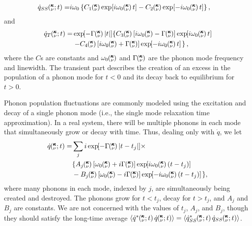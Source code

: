 \begin{equation}\label{A:E:qdot_A_SS}
\begin{split}
\dot{q}_{SS}\kvt=& i\omega_0\left\{C_1\kv\exp[i\omega_0\kv t]-C_2\kv
\exp[-i\omega_0\kv t]\right\} ,
\end{split}
\end{equation}
and
\begin{equation}\label{E:qdot_A_T}
\begin{split}
\dot{q}_{T}\kvt=& \EXP{-\Gamma\kv |t|}\left\{C_3\kv
\left[i\omega_0\kv-\Gamma\kv\right]\EXP{i\omega_0\kv t}\right. \\
& \left.-C_4\kv\left[i\omega_0\kv+\Gamma\kv\right]\EXP{-i\omega_0\kv t}\;
\right\},
\end{split}
\end{equation}
where the $C$s are constants and $\omega_0\mspace{-4.0mu}\left(\mspace{-8.0mu} \begin{smallmatrix}&\pmb{\kappa} \\&\nu\end{smallmatrix} \mspace{-3.0mu}\right)$ and $\Gamma\mspace{-4.0mu}\left(\mspace{-8.0mu} \begin{smallmatrix}&\pmb{\kappa} \\&\nu\end{smallmatrix} \mspace{-3.0mu}\right)$ are the 
phonon
mode frequency and linewidth.  The transient part
describes the creation of an excess in the population of a phonon mode 
for
$t<0$ and its decay back to equilibrium for $t>0$.

Phonon population fluctuations are commonly modeled using the excitation 
and decay of
a single phonon mode (i.e., the single mode relaxation time approximation).
In a real system, there will be multiple phonons in
each mode that simultaneously grow or decay with time.  Thus, dealing 
only
with $\dot{q}$, we let
\begin{equation}\label{A:E:qdot_A_kvbat}
\begin{split}
\dot{q}\kvt =& \sum_j i\EXP{-\Gamma\kv |t-t_j|}\times \\
& \lbrace A_j\kv\left[\omega_0\kv+i\Gamma\kv\right]
\EXP{i\omega_0\kv (t-t_j)} \\
& -B_j\kv \left[\omega_0\kv-i\Gamma\kv\right]\EXP{-i\omega_0\kv (t-t_j) }
\; \rbrace,
\end{split}
\end{equation}
where many phonons in each mode, indexed by $j$, are simultaneously 
being
created and destroyed.  The phonons grow for $t<t_j$, decay for $t>t_j$,
and $A_j$ and $B_j$ are constants.  We are  not concerned with the 
values of
$t_j$, $A_j$, and $B_j$, though they should satisfy the long-time average
$\langle\dot{q}^*\kvt\dot{q}\kvt\rangle = \langle\dot{q}_{SS}^*\kvt
\dot{q}_{SS}\kvt\rangle$.

